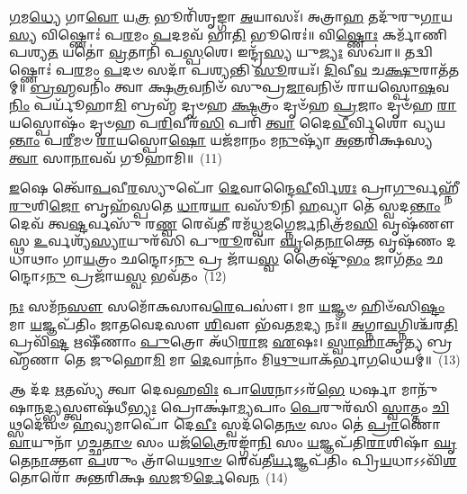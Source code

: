 \-\ul{𑌗}\-𑌮\-\ul{𑌧𑍍𑌯𑍇} 𑌗𑌾\-\ul{𑌵𑍋} 𑌯\-\ul{𑌤𑍍𑌰} 𑌭𑍂𑌰𑌿᳴𑌶𑍃𑌙𑍍𑌗𑌾 \ul{𑌅}\-𑌯𑌾𑌸𑌃᳴। 𑌅𑌤𑍍𑌰𑌾\-\ul{𑌹} 𑌤𑌦𑍁᳴𑌰𑍁\-\ul{𑌗𑌾}\-𑌯\-\ul{𑌸𑍍𑌯} 𑌵𑌿𑌷𑍍𑌣𑍋𑌃॑ 𑌪\-\ul{𑌰}\-𑌮𑌂 \ul{𑌪}\-𑌦𑌮𑌵᳴ 𑌭𑌾\-\ul{𑌤𑌿} 𑌭𑍂𑌰𑍇𑌃॑॥ 𑌵𑌿\-\ul{𑌷𑍍𑌣𑍋𑌃} 𑌕𑌰𑍍𑌮𑌾᳴𑌣𑌿 𑌪𑌶𑍍𑌯\-\ul{𑌤} 𑌯𑌤𑍋॑ \ul{𑌵𑍍𑌰}\-𑌤𑌾𑌨𑌿᳴ 𑌪\-\ul{𑌸𑍍𑌪}\-𑌶𑍇। 𑌇𑌨𑍍𑌦𑍍𑌰᳴\-\ul{𑌸𑍍𑌯} 𑌯𑍁\-\ul{𑌜𑍍𑌯𑌃} 𑌸𑌖𑌾॑॥ 𑌤𑌦𑍍𑌵𑌿𑌷𑍍𑌣𑍋𑌃॑ 𑌪\-\ul{𑌰}\-𑌮𑌂 \ul{𑌪}\-𑌦𑍞 𑌸𑌦𑌾᳴ 𑌪𑌶𑍍𑌯𑌨𑍍𑌤𑌿 \ul{𑌸𑍂}\-𑌰𑌯𑌃᳴। \ul{𑌦𑌿}\-𑌵𑍀\-\ul{𑌵} 𑌚\-\ul{𑌕𑍍𑌷𑍁}\-𑌰𑌾𑌤᳴𑌤𑌮𑍍॥ \ul{𑌬𑍍𑌰}\-\-\ul{𑌹𑍍𑌮}\-𑌵𑌨𑌿𑌂᳴ 𑌤𑍍𑌵𑌾 𑌕𑍍𑌷\-\ul{𑌤𑍍𑌰}\-𑌵𑌨𑌿𑍞᳴ 𑌸𑍁𑌪𑍍𑌰\-\ul{𑌜𑌾}\-𑌵𑌨𑌿𑍞᳴ 𑌰𑌾𑌯𑌸𑍍𑌪𑍋\-\ul{𑌷}\-𑌵\-\ul{𑌨𑌿𑌂} 𑌪𑌰𑍍𑌯𑍂᳴𑌹𑌾\-\ul{𑌮𑌿} 𑌬𑍍𑌰𑌹𑍍𑌮᳴ 𑌦𑍃𑍞𑌹 \ul{𑌕𑍍𑌷}\-𑌤𑍍𑌰𑌂 𑌦𑍃𑍞᳴𑌹 \ul{𑌪𑍍𑌰}\-𑌜𑌾𑌂 𑌦𑍃𑍞᳴𑌹 \ul{𑌰𑌾}\-𑌯𑌸𑍍𑌪𑍋𑌷𑌂᳴ 𑌦𑍃𑍞𑌹 𑌪\-\ul{𑌰𑌿}\-𑌵𑍀𑌰᳴\-\ul{𑌸𑌿} 𑌪𑌰𑌿᳴ \ul{𑌤𑍍𑌵𑌾} 𑌦𑍈\-\ul{𑌵𑍀}\-𑌰𑍍𑌵𑌿𑌶𑍋॑ 𑌵𑍍𑌯𑌯\-\ul{𑌨𑍍𑌤𑌾𑌂} 𑌪\-\ul{𑌰𑍀}\-𑌮𑍞 \ul{𑌰𑌾}\-𑌯𑌸𑍍𑌪𑍋\-\ul{𑌷𑍋} 𑌯𑌜᳴𑌮𑌾𑌨𑌂 𑌮\-\ul{𑌨𑍁}\-𑌷𑍍𑌯𑌾᳴ \ul{𑌅}\-𑌨𑍍𑌤𑌰𑌿᳴𑌕𑍍𑌷𑌸𑍍𑌯 \ul{𑌤𑍍𑌵𑌾} 𑌸𑌾\-\ul{𑌨𑌾}\-𑌵𑌵᳴ 𑌗𑍂𑌹𑌾𑌮𑌿॥~(11)

{\anuvakamend[{\-\ul{𑌉}\-\-\ul{𑌶𑍍𑌮}\-\-\ul{𑌸𑍀} 𑌪𑍋\-\ul{𑌷}\-𑌮𑍇\-\ul{𑌕𑌾}\-𑌨𑍍𑌨𑌵𑌿𑍞᳴\-\ul{𑌶}\-𑌤𑌿𑌶𑍍𑌚᳴}]}%

\-\ul{𑌇}\-𑌷𑍇 𑌤𑍍𑌵𑍋᳴\-\ul{𑌪}\-𑌵𑍀\-\ul{𑌰}\-𑌸𑍍𑌯𑍁𑌪𑍋᳴ \ul{𑌦𑍇}\-𑌵𑌾𑌨𑍍𑌦𑍈\-\ul{𑌵𑍀}\-𑌰𑍍𑌵𑌿\-\ul{𑌶𑌃} 𑌪𑍍𑌰𑌾\-\ul{𑌗𑍁}\-𑌰𑍍𑌵𑌹𑍍𑌨𑍀᳴\-\ul{𑌰𑍁}\-𑌶𑌿\-\ul{𑌜𑍋} 𑌬𑍃𑌹᳴𑌸𑍍𑌪𑌤𑍇 \ul{𑌧𑌾}\-𑌰\-\ul{𑌯𑌾} 𑌵𑌸𑍂᳴𑌨𑌿 \ul{𑌹}\-𑌵𑍍𑌯𑌾 𑌤𑍇॑ 𑌸𑍍𑌵𑌦\-\ul{𑌨𑍍𑌤𑌾𑌂} 𑌦𑍇𑌵᳴ 𑌤𑍍𑌵\-\ul{𑌷𑍍𑌟}\-𑌰𑍍𑌵𑌸𑍁᳴ 𑌰\-\ul{𑌣𑍍𑌵} 𑌰𑍇𑌵᳴\-\ul{𑌤𑍀} 𑌰𑌮᳴𑌧𑍍𑌵\-\ul{𑌮}\-𑌗𑍍𑌨𑍇\-\ul{𑌰𑍍𑌜}\-𑌨𑌿𑌤𑍍𑌰᳴𑌮\-\ul{𑌸𑌿} 𑌵𑍃𑌷᳴𑌣𑍗 𑌸𑍍𑌥 \ul{𑌉}\-𑌰𑍍𑌵𑌶𑍍𑌯᳴\-\ul{𑌸𑍍𑌯𑌾}\-𑌯𑍁𑌰᳴𑌸𑌿 𑌪𑍁\-\ul{𑌰𑍂}\-𑌰𑌵𑌾᳴ \ul{𑌘𑍃}\-𑌤𑍇\-\ul{𑌨𑌾}\-𑌕𑍍𑌤𑍇 𑌵𑍃𑌷᳴𑌣𑌂 𑌦𑌧𑌾𑌥𑌾𑌂 𑌗𑌾\-\ul{𑌯}\-𑌤𑍍𑌰𑌂 𑌛𑌨𑍍𑌦𑍋\-𑌽\-\ul{𑌨𑍁} 𑌪𑍍𑌰 𑌜𑌾᳴𑌯\-\ul{𑌸𑍍𑌵} 𑌤𑍍𑌰𑍈𑌷𑍍𑌟𑍁᳴\-\ul{𑌭𑌂} 𑌜𑌾𑌗᳴\-\ul{𑌤𑌂} 𑌛𑌨𑍍𑌦𑍋\-𑌽\-\ul{𑌨𑍁} 𑌪𑍍𑌰𑌜𑌾᳴𑌯\-\ul{𑌸𑍍𑌵} 𑌭𑌵᳴𑌤𑌂~(12)

\-\ul{𑌨𑌃} 𑌸𑌮᳴𑌨\-\ul{𑌸𑍗} 𑌸𑌮𑍋᳴𑌕𑌸𑌾𑌵\-\ul{𑌰𑍇}\-𑌪𑌸𑍗॑। 𑌮𑌾 \ul{𑌯}\-𑌜𑍍𑌞𑍞 𑌹𑌿𑍞᳴𑌸𑌿\-\ul{𑌷𑍍𑌟𑌂} 𑌮𑌾 \ul{𑌯}\-𑌜𑍍𑌞𑌪᳴𑌤𑌿𑌂 𑌜𑌾𑌤𑌵𑍇𑌦𑌸𑍗 \ul{𑌶𑌿}\-𑌵𑍗 𑌭᳴𑌵𑌤\-\ul{𑌮}\-𑌦𑍍𑌯 𑌨𑌃᳴॥ \ul{𑌅}\-𑌗𑍍𑌨𑌾\-\ul{𑌵}\-𑌗𑍍𑌨𑌿𑌶𑍍𑌚᳴𑌰\-\ul{𑌤𑌿} 𑌪𑍍𑌰𑌵𑌿᳴\-\ul{𑌷𑍍𑌟} 𑌋𑌷𑍀᳴𑌣𑌾𑌂 \ul{𑌪𑍁}\-𑌤𑍍𑌰𑍋 𑌅᳴𑌧𑌿\-\ul{𑌰𑌾}\-𑌜 \ul{𑌏}\-𑌷𑌃। \ul{𑌸𑍍𑌵𑌾}\-\-\ul{𑌹𑌾}\-𑌕𑍃\-\ul{𑌤𑍍𑌯} 𑌬𑍍𑌰𑌹𑍍𑌮᳴𑌣𑌾 𑌤𑍇 𑌜𑍁𑌹𑍋\-\ul{𑌮𑌿} 𑌮𑌾 \ul{𑌦𑍇}\-𑌵𑌾𑌨𑌾𑌂॑ 𑌮𑌿\-\ul{𑌥𑍁}\-𑌯𑌾𑌕᳴𑌰𑍍𑌭𑌾\-\ul{𑌗}\-𑌧𑍇𑌯𑌮𑍍॑॥~(13)

{\anuvakamend[{𑌭𑌵᳴\-\ul{𑌤}\-𑌮𑍇𑌕᳴𑌤𑍍𑌰𑌿𑍞𑌶𑌚𑍍𑌚}]}%

𑌆 𑌦᳴𑌦 \ul{𑌋}\-𑌤𑌸𑍍𑌯᳴ 𑌤𑍍𑌵𑌾 𑌦𑍇𑌵𑌹\-\ul{𑌵𑌿𑌃} 𑌪𑌾\-\ul{𑌶𑍇}\-𑌨𑌾\-𑌽\-𑌽𑌰᳴\-\ul{𑌭𑍇} 𑌧𑌰𑍍\mbox{}\-\ul{𑌷𑌾} 𑌮𑌾𑌨𑍁᳴𑌷𑌾\-\ul{𑌨}\-𑌦𑍍𑌭𑍍𑌯𑌸𑍍𑌤𑍍𑌵𑍗𑌷᳴𑌧𑍀\-\ul{𑌭𑍍𑌯𑌃} 𑌪𑍍𑌰𑍋𑌕𑍍𑌷𑌾॑\-\ul{𑌮𑍍𑌯}\-𑌪𑌾𑌂 \ul{𑌪𑍇}\-𑌰𑍁𑌰᳴𑌸𑌿 \ul{𑌸𑍍𑌵𑌾}\-𑌤𑍍𑌤𑌂 \ul{𑌚𑌿}\-𑌥𑍍𑌸𑌦𑍇᳴𑌵𑍞 \ul{𑌹}\-𑌵𑍍𑌯𑌮𑌾𑌪𑍋᳴ 𑌦𑍇\-\ul{𑌵𑍀𑌃} 𑌸𑍍𑌵𑌦᳴𑌤𑍈\-\ul{𑌨}\-\-\ul{𑍞} 𑌸𑌂 𑌤𑍇॑ \ul{𑌪𑍍𑌰𑌾}\-𑌣𑍋 \ul{𑌵𑌾}\-𑌯𑍁𑌨𑌾᳴ 𑌗𑌚𑍍𑌛\-\ul{𑌤𑌾}\-\-\ul{𑍞} 𑌸𑌂 𑌯𑌜᳴\-\ul{𑌤𑍍𑌰𑍈}\-𑌰𑌙𑍍𑌗𑌾᳴\-\ul{𑌨𑌿} 𑌸𑌂 \ul{𑌯}\-𑌜𑍍𑌞𑌪᳴𑌤𑌿\-\ul{𑌰𑌾}\-𑌶𑌿𑌷𑌾᳴ \ul{𑌘𑍃}\-𑌤𑍇\-\ul{𑌨𑌾}\-𑌕𑍍𑌤𑍗 \ul{𑌪}\-𑌶𑍁𑌂 𑌤𑍍𑌰𑌾᳴𑌯𑍇\-\ul{𑌥𑌾}\-\-\ul{𑍞} 𑌰𑍇𑌵᳴𑌤𑍀\-\ul{𑌰𑍍𑌯}\-𑌜𑍍𑌞𑌪᳴𑌤𑌿𑌂 𑌪𑍍𑌰𑌿\-\ul{𑌯}\-𑌧𑌾\-𑌽\-𑌽𑌵𑌿᳴\-\ul{𑌶}\-𑌤𑍋𑌰𑍋᳴ 𑌅𑌨𑍍𑌤𑌰𑌿𑌕𑍍𑌷 \ul{𑌸}\-𑌜𑍂\-\ul{𑌰𑍍𑌦𑍇}\-𑌵𑍇\-\ul{𑌨}\-~(14)

